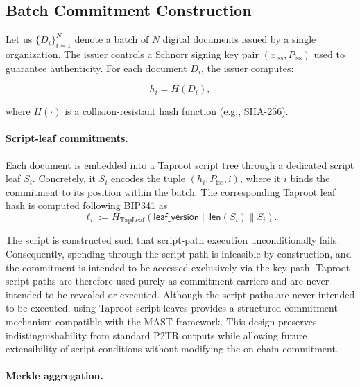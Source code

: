 \documentclass{IEEEoj}
\begin{document}
\subsection{Batch Commitment Construction}
\label{sec:createcommit}

Let us $\{D_i\}_{i=1}^{N}$ denote a batch of $N$ digital documents issued by a single organization.  The issuer controls a Schnorr signing key pair $(x_{\mathrm{iss}}, P_{\mathrm{iss}})$ used to guarantee authenticity. For each document $D_i$, the issuer computes:

\begin{equation}
h_i = H(D_i),
\label{eq:doc_hash}
\end{equation}

where $H(\cdot)$ is a collision-resistant hash function (e.g., SHA-256).

\paragraph{Script-leaf commitments.}

Each document is embedded into a Taproot script tree through a dedicated script leaf $S_i$.  Concretely, it $S_i$ encodes the tuple $(h_i, P_{\mathrm{iss}}, i)$, where it $i$ binds the commitment to its position within the batch. The corresponding Taproot leaf hash is computed following BIP341 as
\begin{equation}
\ell_i := H_{\text{TapLeaf}}(\textsf{leaf\_version} \parallel \textsf{len}(S_i) \parallel S_i).
\label{eq:tapleaf}
\end{equation}

The script is constructed such that script-path execution unconditionally fails.  
Consequently, spending through the script path is infeasible by construction, and the commitment is intended to be accessed exclusively via the key path.  Taproot script paths are therefore used purely as commitment carriers and are never intended to be revealed or executed.
Although the script paths are never intended to be executed, using Taproot script leaves provides a structured commitment mechanism compatible with the MAST framework.
This design preserves indistinguishability from standard P2TR outputs while allowing
future extensibility of script conditions without modifying the on-chain commitment.

\paragraph{Merkle aggregation.}
\end{document}
